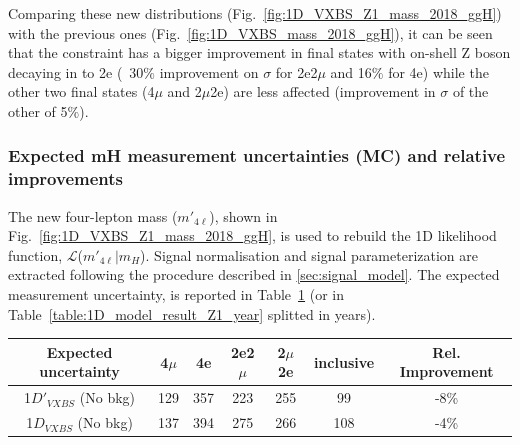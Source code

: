Comparing these new distributions (Fig.~\ref{fig:1D_VXBS_Z1_mass_2018_ggH}) with the previous ones (Fig.~\ref{fig:1D_VXBS_mass_2018_ggH}), it can be seen that the \Zone constraint has a bigger improvement in final states with on-shell Z boson decaying in to 2e (~30$\%$ improvement on $\sigma$ for 2e2$\mu$ and 16$\%$ for 4e) while the other two final states (4$\mu$ and 2$\mu$2e) are less affected (improvement in $\sigma$ of the other of 5$\%$).

\subsubsection{Expected mH measurement uncertainties (MC) and relative improvements}
The new four-lepton mass ($m'_{4\ell}$), shown in Fig.~\ref{fig:1D_VXBS_Z1_mass_2018_ggH},
is used to rebuild the 1D likelihood function, $\mathcal{L}$($m'_{4\ell}|m_{H}$). Signal normalisation and signal parameterization are extracted following the procedure described in \ref{sec:signal_model}.
The expected \mH measurement uncertainty, is reported in Table~\ref{table:1D_model_result_Z1} (or in Table~\ref{table:1D_model_result_Z1_year}
splitted in years).
\begin{table}[ht]	
\begin{center}
    \begin{tabular}{ccccccc}
        \hline			
    Expected uncertainty	&	4$\mu$	&	4e	&	2e2$\mu$	&2$\mu$2e	& inclusive & Rel. Improvement \\
        \hline			
        1$D'_{VXBS}$ (No bkg)	&	129	&	357	&	223	&	255	&	99	&	-8\%	\\
        1$D_{VXBS}$  (No bkg)	&	137	&	394	&	275	&	266	&	108 &	-4\%	\\
        \hline
\end{tabular}
\label{table:1D_model_result_Z1}
\end{center}
\end{table}
